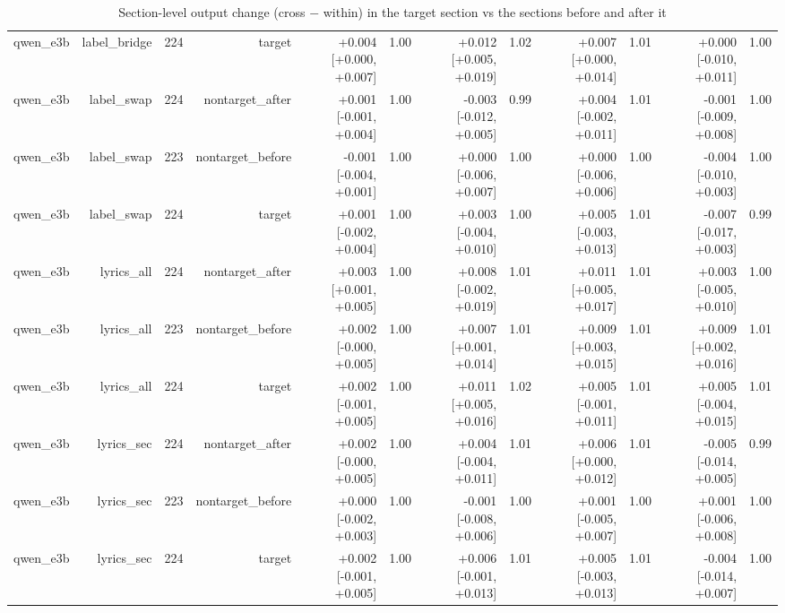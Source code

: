 \begin{table}[t]
\begin{tabular}{lrrrrrrrrrrr}
qwen\_e3b & label\_bridge & 224 & target & +0.004 [+0.000, +0.007] & 1.00 & +0.012 [+0.005, +0.019] & 1.02 & +0.007 [+0.000, +0.014] & 1.01 & +0.000 [-0.010, +0.011] & 1.00 \\
qwen\_e3b & label\_swap & 224 & nontarget\_after & +0.001 [-0.001, +0.004] & 1.00 & -0.003 [-0.012, +0.005] & 0.99 & +0.004 [-0.002, +0.011] & 1.01 & -0.001 [-0.009, +0.008] & 1.00 \\
qwen\_e3b & label\_swap & 223 & nontarget\_before & -0.001 [-0.004, +0.001] & 1.00 & +0.000 [-0.006, +0.007] & 1.00 & +0.000 [-0.006, +0.006] & 1.00 & -0.004 [-0.010, +0.003] & 1.00 \\
qwen\_e3b & label\_swap & 224 & target & +0.001 [-0.002, +0.004] & 1.00 & +0.003 [-0.004, +0.010] & 1.00 & +0.005 [-0.003, +0.013] & 1.01 & -0.007 [-0.017, +0.003] & 0.99 \\
qwen\_e3b & lyrics\_all & 224 & nontarget\_after & +0.003 [+0.001, +0.005] & 1.00 & +0.008 [-0.002, +0.019] & 1.01 & +0.011 [+0.005, +0.017] & 1.01 & +0.003 [-0.005, +0.010] & 1.00 \\
qwen\_e3b & lyrics\_all & 223 & nontarget\_before & +0.002 [-0.000, +0.005] & 1.00 & +0.007 [+0.001, +0.014] & 1.01 & +0.009 [+0.003, +0.015] & 1.01 & +0.009 [+0.002, +0.016] & 1.01 \\
qwen\_e3b & lyrics\_all & 224 & target & +0.002 [-0.001, +0.005] & 1.00 & +0.011 [+0.005, +0.016] & 1.02 & +0.005 [-0.001, +0.011] & 1.01 & +0.005 [-0.004, +0.015] & 1.01 \\
qwen\_e3b & lyrics\_sec & 224 & nontarget\_after & +0.002 [-0.000, +0.005] & 1.00 & +0.004 [-0.004, +0.011] & 1.01 & +0.006 [+0.000, +0.012] & 1.01 & -0.005 [-0.014, +0.005] & 0.99 \\
qwen\_e3b & lyrics\_sec & 223 & nontarget\_before & +0.000 [-0.002, +0.003] & 1.00 & -0.001 [-0.008, +0.006] & 1.00 & +0.001 [-0.005, +0.007] & 1.00 & +0.001 [-0.006, +0.008] & 1.00 \\
qwen\_e3b & lyrics\_sec & 224 & target & +0.002 [-0.001, +0.005] & 1.00 & +0.006 [-0.001, +0.013] & 1.01 & +0.005 [-0.003, +0.013] & 1.01 & -0.004 [-0.014, +0.007] & 1.00 \\
\bottomrule
\end{tabular}
\caption{Section-level output change (cross $-$ within) in the target section vs the sections before and after it}
\label{tab:interventions_effects_sections}
\end{table}
